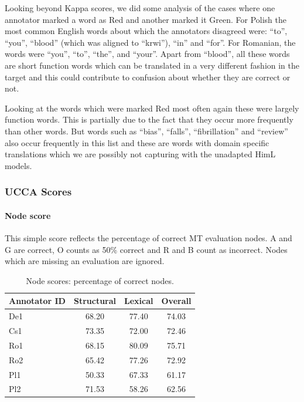 \documentclass[11pt]{article}
\begin{document}
Looking beyond Kappa scores, we did some analysis of the cases where
one annotator marked a word as Red and another marked it Green. 
For Polish  the most common English words about which the annotators
disagreed were: ``to'', ``you'', ``blood'' (which was aligned to ``krwi''), ``in'' and ``for''. 
For Romanian, the words were ``you'', ``to'', ``the'', and ``your''. 
Apart from ``blood'', all these words are short function words which can 
be translated in a very different fashion in the target and this could contribute to
 confusion about
whether they are correct or not.

Looking at the words which were marked Red most often again these were largely function words.
This is partially due to the fact that they occur more frequently than other words. But
words such as ``bias'', ``falls'', ``fibrillation'' and ``review'' also occur frequently in this list and these
are words with domain specific translations which we are possibly not capturing with
the unadapted HimL models.

\subsubsection{UCCA Scores}

\paragraph{Node score} This simple score reflects the percentage of correct MT evaluation nodes. 
A and G are correct, O counts as 50\% correct and R and B count as incorrect. Nodes which are missing an
evaluation are ignored.

\begin{table}[h!]
\begin{center}
      \begin{tabular}{|l|c|c|c|}
      \hline
\bf{Annotator ID}  & \bf{Structural } & \bf{Lexical } & \bf{Overall }\\
\hline                               
    De1  &  68.20 & 77.40 & 74.03 \\ 
    Cs1  & 73.35 & 72.00 & 72.46 \\ 
    Ro1  & 68.15 & 80.09 & 75.71 \\ 
    Ro2  & 65.42 & 77.26  & 72.92 \\ 
    Pl1  & 50.33 & 67.33 & 61.17 \\ 
    Pl2  & 71.53 &58.26  & 62.56 \\ 
      \hline
    \end{tabular}
\end{center}
\normalsize
\vspace*{-3ex}
\caption{Node scores: percentage of correct nodes. 
}
\label{tab:node_scores}
\end{table}
\end{document}
